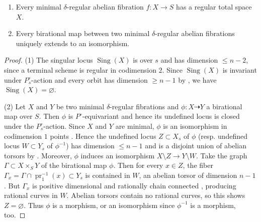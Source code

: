 \documentclass[reqno, letterpaper]{amsart}
\numberwithin{equation}{subsection}
\let\emptyset\varnothing
\let\to\longrightarrow
\DeclareMathOperator{\Sing}{Sing}
\DeclareMathOperator{\pr}{pr}
\begin{document}
		\begin{proposition} \label{prop:minimal delta-regular abelian fibration is unique}
			\begin{enumerate}
				\item Every minimal $\delta$-regular abelian fibration $f : X \to S$ has a regular total space $X$.
				\item Every birational map between two minimal $\delta$-regular abelian fibrations uniquely extends to an isomorphism.
			\end{enumerate}
		\end{proposition}
		\begin{proof}
			(1) The singular locus $\Sing(X)$ is over $s$ and has dimension $\le n-2$, since a terminal scheme is regular in codimension $2$. Since $\Sing(X)$ is invariant under $P^\circ_s$-action and every orbit has dimension $\ge n-1$ by , we have $\Sing(X) = \emptyset$.
			
			\medskip
			
			(2) Let $X$ and $Y$ be two minimal $\delta$-regular fibrations and $\phi : X \dashrightarrow Y$ a birational map over $S$. Then $\phi$ is $P^\circ$-equivariant and hence its undefined locus is closed under the $P^\circ_s$-action. Since $X$ and $Y$ are minimal, $\phi$ is an isomorphism in codimension $1$ points \cite[Corollary~3.54]{kol-mori}. Hence the undefined locus $Z \subset X_s$ of $\phi$ (resp. undefined locus $W \subset Y_s$ of $\phi^{-1}$) has dimension $\le n-1$ and is a disjoint union of abelian torsors by . Moreover, $\phi$ induces an isomorphism $X \setminus Z \to Y \setminus W$. Take the graph $\Gamma \subset X \times_S Y$ of the birational map $\phi$. Then for every $x \in Z$, the fiber $\Gamma_x = \Gamma \cap \pr_1^{-1}(x) \subset Y_s$ is contained in $W$, an abelian torsor of dimension $n-1$. But $\Gamma_x$ is positive dimensional and rationally chain connected \cite[Theorem~VI.1.2]{kol:rational} \cite[Corollary~1.5]{hacon-mcker07}, producing rational curves in $W$. Abelian torsors contain no rational curves, so this shows $Z = \emptyset$. Thus $\phi$ is a morphism, or an isomorphism since $\phi^{-1}$ is a morphism, too.
		\end{proof}
		
\end{document}

